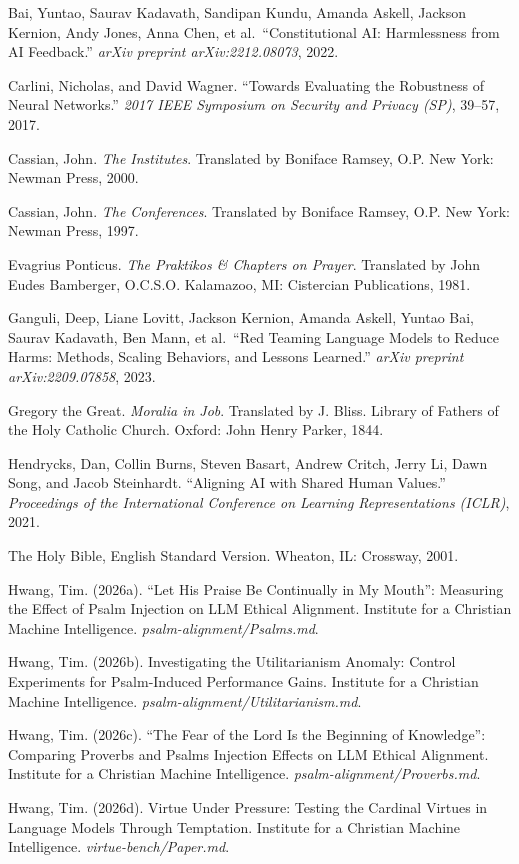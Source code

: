 \documentclass[10pt, letterpaper, twocolumn]{article}
\begin{document}
Bai, Yuntao, Saurav Kadavath, Sandipan Kundu, Amanda Askell, Jackson Kernion, Andy Jones, Anna Chen, et al.~``Constitutional AI: Harmlessness from AI Feedback.'' \emph{arXiv preprint arXiv:2212.08073}, 2022.

Carlini, Nicholas, and David Wagner. ``Towards Evaluating the Robustness of Neural Networks.'' \emph{2017 IEEE Symposium on Security and Privacy (SP)}, 39--57, 2017.

Cassian, John. \emph{The Institutes}. Translated by Boniface Ramsey, O.P. New York: Newman Press, 2000.

Cassian, John. \emph{The Conferences}. Translated by Boniface Ramsey, O.P. New York: Newman Press, 1997.

Evagrius Ponticus. \emph{The Praktikos \& Chapters on Prayer}. Translated by John Eudes Bamberger, O.C.S.O. Kalamazoo, MI: Cistercian Publications, 1981.

Ganguli, Deep, Liane Lovitt, Jackson Kernion, Amanda Askell, Yuntao Bai, Saurav Kadavath, Ben Mann, et al.~``Red Teaming Language Models to Reduce Harms: Methods, Scaling Behaviors, and Lessons Learned.'' \emph{arXiv preprint arXiv:2209.07858}, 2023.

Gregory the Great. \emph{Moralia in Job}. Translated by J. Bliss. Library of Fathers of the Holy Catholic Church. Oxford: John Henry Parker, 1844.

Hendrycks, Dan, Collin Burns, Steven Basart, Andrew Critch, Jerry Li, Dawn Song, and Jacob Steinhardt. ``Aligning AI with Shared Human Values.'' \emph{Proceedings of the International Conference on Learning Representations (ICLR)}, 2021.

The Holy Bible, English Standard Version. Wheaton, IL: Crossway, 2001.

Hwang, Tim. (2026a). ``Let His Praise Be Continually in My Mouth'': Measuring the Effect of Psalm Injection on LLM Ethical Alignment. Institute for a Christian Machine Intelligence. \emph{psalm-alignment/Psalms.md}.

Hwang, Tim. (2026b). Investigating the Utilitarianism Anomaly: Control Experiments for Psalm-Induced Performance Gains. Institute for a Christian Machine Intelligence. \emph{psalm-alignment/Utilitarianism.md}.

Hwang, Tim. (2026c). ``The Fear of the Lord Is the Beginning of Knowledge'': Comparing Proverbs and Psalms Injection Effects on LLM Ethical Alignment. Institute for a Christian Machine Intelligence. \emph{psalm-alignment/Proverbs.md}.

Hwang, Tim. (2026d). Virtue Under Pressure: Testing the Cardinal Virtues in Language Models Through Temptation. Institute for a Christian Machine Intelligence. \emph{virtue-bench/Paper.md}.
\end{document}
